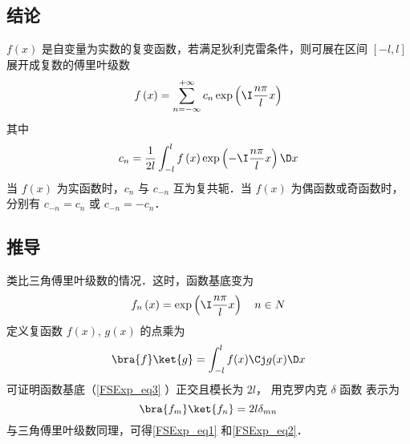 
\subsection{结论}

$f(x)$ 是自变量为实数的复变函数，若满足狄利克雷条件，则可展在区间 $[ - l,l]$ 展开成复数的傅里叶级数
 \begin{equation}\label{FSExp_eq1}
f\left( x \right) = \sum\limits_{n =  - \infty }^{ + \infty } {{c_n}\exp \left( {\I\frac{{n\pi }}{l}x} \right)}  
\end{equation}
其中
 \begin{equation}\label{FSExp_eq2}
{c_n} = \frac{1}{{2l}}\int_{ - l}^l {f\left( x \right)\exp \left( {-\I\frac{{n\pi }}{l}x} \right)\D x} 
\end{equation}
当 $f(x)$ 为实函数时，$c_n$ 与 $c_{-n}$ 互为复共轭．当 $f(x)$ 为偶函数或奇函数时，分别有 $c_{-n} = c_n$ 或 $c_{-n} = -c_n$．

\subsection{推导}
类比三角傅里叶级数的情况．这时，函数基底变为
 \begin{equation}\label{FSExp_eq3}
{f_n}\left( x \right) = \exp \left( {\I\frac{{n\pi }}{l}x} \right) \quad{n \in N}
\end{equation} 
定义复函数 $f(x)$, $g(x)$ 的点乘为
\begin{equation}
\bra{f}\ket{g} = \int_{-l}^{l}  f(x)\Cj g(x) \D x
\end{equation}
可证明函数基底（\autoref{FSExp_eq3} ）正交且模长为 $2l$， 用克罗内克 $\delta$ 函数%
表示为
\begin{equation}
\bra{f_m}\ket{f_n} = 2l{\delta _{mn}}
\end{equation}      
与三角傅里叶级数同理，可得\autoref{FSExp_eq1} 和\autoref{FSExp_eq2}．

